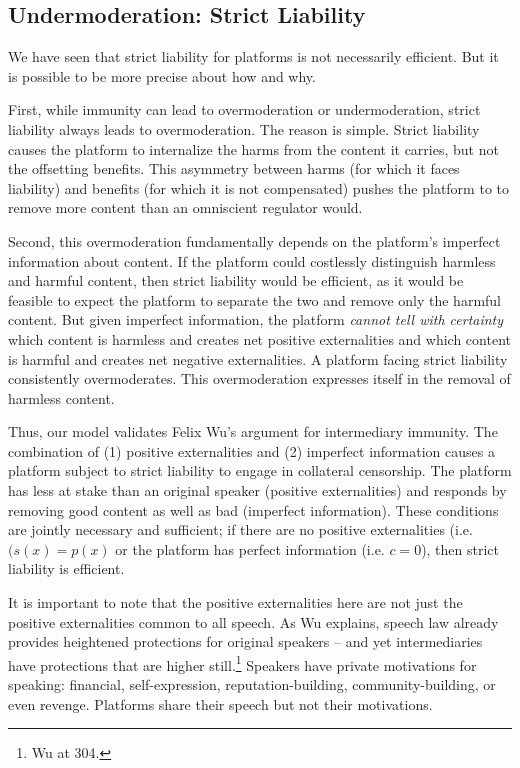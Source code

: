 \subsection{Undermoderation: Strict Liability}

We have seen that strict liability for platforms is not necessarily efficient. But it is possible to be more precise about how and why.

First, while immunity can lead to overmoderation or undermoderation, strict liability always leads to overmoderation.  The reason is simple. Strict liability causes the platform to internalize the harms from the content it carries, but not the offsetting benefits. This asymmetry between harms (for which it faces liability) and benefits (for which it is not compensated) pushes the platform to to remove more content than an omniscient regulator would.

Second, this overmoderation fundamentally depends on the platform's imperfect information about content. If the platform could costlessly distinguish harmless and harmful content, then strict liability would be efficient, as it would be feasible to expect the platform to separate the two and remove only the harmful content. But given imperfect information, the platform \emph{cannot tell with certainty} which content is harmless and creates net positive externalities and which content is harmful and creates net negative externalities. A platform facing strict liability consistently overmoderates. This overmoderation expresses itself in the removal of harmless content.

Thus, our model validates Felix Wu's argument for intermediary immunity. The combination of (1) positive externalities and (2) imperfect information causes a platform subject to strict liability to engage in collateral censorship. The platform has less at stake than an original speaker (positive externalities) and responds by removing good content as well as bad (imperfect information). These conditions are jointly necessary and sufficient; if there are no positive externalities (i.e. $(s(x) = p(x)$ or the platform has perfect information (i.e. $c = 0$), then strict liability is efficient.

It is important to note that the positive externalities here are not just the positive externalities common to all speech. As Wu explains, speech law already provides heightened protections for original speakers -- and yet intermediaries have protections that are higher still.\footnote{Wu at 304.} Speakers have private motivations for speaking: financial, self-expression, reputation-building, community-building, or even revenge. Platforms share their speech but not their motivations.

